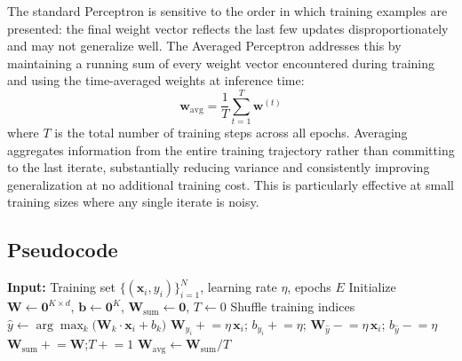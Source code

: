 \documentclass[12pt]{article}
\begin{document}
The standard Perceptron is sensitive to the order in which training examples are
presented: the final weight vector reflects the last few updates disproportionately and
may not generalize well. The Averaged Perceptron \cite{collins2002} addresses this by
maintaining a running sum of every weight vector encountered during training and using the
time-averaged weights at inference time:
\[
  \mathbf{w}_\text{avg} = \frac{1}{T} \sum_{t=1}^{T} \mathbf{w}^{(t)}
\]
where $T$ is the total number of training steps across all epochs. Averaging aggregates
information from the entire training trajectory rather than committing to the last iterate,
substantially reducing variance and consistently improving generalization at no additional
training cost. This is particularly effective at small training sizes where any single
iterate is noisy.

\subsection{Pseudocode}

\begin{algorithm}[H]
\caption{Averaged Perceptron Training}
\begin{algorithmic}[1]
\State \textbf{Input:} Training set $\{(\mathbf{x}_i, y_i)\}_{i=1}^N$,
       learning rate $\eta$, epochs $E$
\State Initialize $\mathbf{W} \leftarrow \mathbf{0}^{K \times d}$,\;
       $\mathbf{b} \leftarrow \mathbf{0}^K$,\;
       $\mathbf{W}_\text{sum} \leftarrow \mathbf{0}$,\; $T \leftarrow 0$
  \State Shuffle training indices
    \State $\hat{y} \leftarrow \arg\max_{k}\bigl(\mathbf{W}_k \cdot \mathbf{x}_i + b_k\bigr)$
      \State $\mathbf{W}_{y_i} \mathrel{+}= \eta\,\mathbf{x}_i$;\;
             $b_{y_i} \mathrel{+}= \eta$;\;
             $\mathbf{W}_{\hat{y}} \mathrel{-}= \eta\,\mathbf{x}_i$;\;
             $b_{\hat{y}} \mathrel{-}= \eta$
    \EndIf
    \State $\mathbf{W}_\text{sum} \mathrel{+}= \mathbf{W}$;\quad $T \mathrel{+}= 1$
  \EndFor
\EndFor
\State $\mathbf{W}_\text{avg} \leftarrow \mathbf{W}_\text{sum} / T$
\end{algorithmic}
\end{algorithm}
\end{document}
